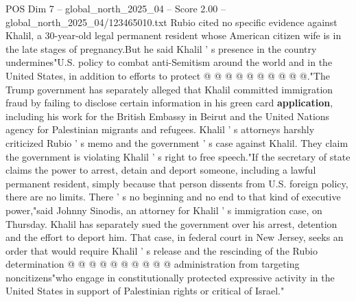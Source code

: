 \begin{textsample}{POS Dim 7 – global\_north\_2025\_04 – Score 2.00 – global\_north\_2025\_04/123465010.txt}
Rubio cited no specific evidence against Khalil, a 30-year-old legal permanent resident whose American citizen wife is in the late stages of pregnancy.But he said Khalil ' s presence in the country undermines"U.S. policy to combat anti-Semitism around the world and in the United States, in addition to efforts to protect @ @ @ @ @ @ @ @ @ @."The Trump government has separately alleged that Khalil committed immigration fraud by failing to disclose certain information in his green card \textbf{application}, including his work for the British Embassy in Beirut and the United Nations agency for Palestinian migrants and refugees.
Khalil ' s attorneys harshly criticized Rubio ' s memo and the government ' s case against Khalil.
They claim the government is violating Khalil ' s right to free speech."If the secretary of state claims the power to arrest, detain and deport someone, including a lawful permanent resident, simply because that person dissents from U.S. foreign policy, there are no limits.
There ' s no beginning and no end to that kind of executive power,"said Johnny Sinodis, an attorney for Khalil ' s immigration case, on Thursday.
Khalil has separately sued the government over his arrest, detention and the effort to deport him.
That case, in federal court in New Jersey, seeks an order that would require Khalil ' s release and the rescinding of the Rubio determination @ @ @ @ @ @ @ @ @ @ administration from targeting noncitizens"who engage in constitutionally protected expressive activity in the United States in support of Palestinian rights or critical of Israel."

\end{textsample}
